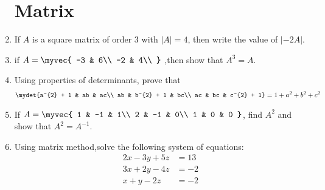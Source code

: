 \begin{enumerate}
\section{\textbf{Matrix}}
\item If $A$ is a square matrix of order 3 with $|A| = 4$, then write the value of $|-2A|$.
\item if $A =\myvec{
-3 & 6\\
-2 & 4\\
	}$ ,then show that $A^3=A$.
 \item Using properties of determinants, prove that
\begin{align*}
    \mydet{a^{2} + 1 & ab & ac\\
                ab & b^{2} + 1 & bc\\
		ac & bc & c^{2} + 1} = 1 + a^{2} + b^{2} + c^{2}
\end{align*}
\item If $A = \myvec{
		1 & -1 & 1\\
		2 & -1 & 0\\
		1 & 0 & 0
	}$, find $ A^{2}$ and show that $A^{2}
 = A^{-1}$.	
\item Using matrix method,solve the following system of equations:
	\begin{align*}
		2x - 3y + 5z &= 13\\
		3x + 2y - 4z &= -2\\
		x + y - 2z &= -2
	\end{align*}
 \end{enumerate}
